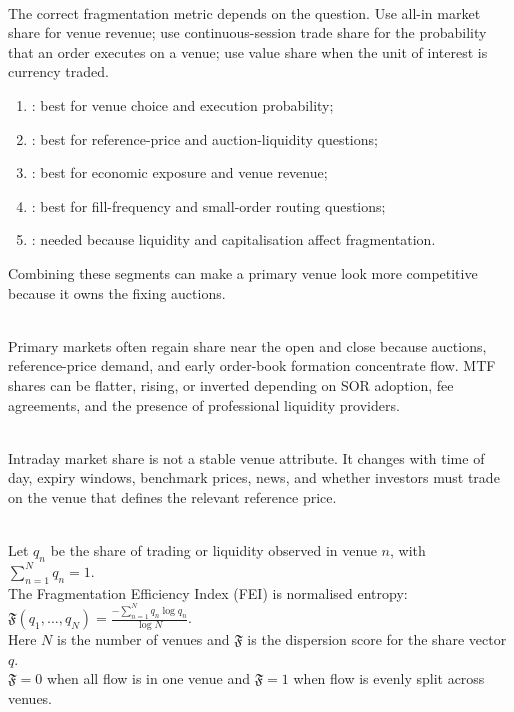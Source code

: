\documentclass[a4paper,oneside,openany]{book}
\begin{document}
\begin{caveat} \\
The correct fragmentation metric depends on the question. Use all-in market share for venue revenue; use continuous-session trade share for the probability that an order executes on a venue; use value share when the unit of interest is currency traded.
\end{caveat}

\begin{taxonomy} 
\begin{enumerate}[label=\roman*.]
\setlength{\itemsep}{0pt}
\item {}: best for venue choice and execution probability;
\item {}: best for reference-price and auction-liquidity questions;
\item {}: best for economic exposure and venue revenue;
\item {}: best for fill-frequency and small-order routing questions;
\item {}: needed because liquidity and capitalisation affect fragmentation.
\end{enumerate}
Combining these segments can make a primary venue look more competitive because it owns the fixing auctions.
\end{taxonomy}

\begin{empiricalfinding} \\
Primary markets often regain share near the open and close because auctions, reference-price demand, and early order-book formation concentrate flow. MTF shares can be flatter, rising, or inverted depending on SOR adoption, fee agreements, and the presence of professional liquidity providers.
\end{empiricalfinding}

\begin{caveat} \\
Intraday market share is not a stable venue attribute. It changes with time of day, expiry windows, benchmark prices, news, and whether investors must trade on the venue that defines the relevant reference price.
\end{caveat}

\begin{definition} \\
Let $q_n$ be the share of trading or liquidity observed in venue $n$, with $\sum_{n=1}^{N}q_n=1$.\\
The Fragmentation Efficiency Index (FEI) is normalised entropy: $\mathfrak{F}(q_1,\ldots,q_N)=\frac{-\sum_{n=1}^{N}q_n\log q_n}{\log N}$.\\
Here $N$ is the number of venues and $\mathfrak{F}$ is the dispersion score for the share vector $q$.\\
$\mathfrak{F}=0$ when all flow is in one venue and $\mathfrak{F}=1$ when flow is evenly split across venues.
\end{definition}
\end{document}
